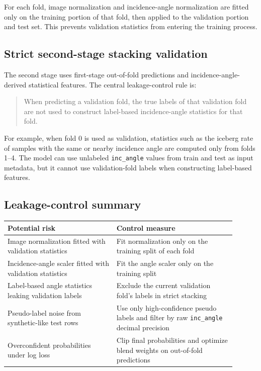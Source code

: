 \documentclass[11pt]{article}
\begin{document}
For each fold, image normalization and incidence-angle normalization are fitted only on the training portion of that fold, then applied to the validation portion and test set. This prevents validation statistics from entering the training process.

\subsection{Strict second-stage stacking validation}

The second stage uses first-stage out-of-fold predictions and incidence-angle-derived statistical features. The central leakage-control rule is:

\begin{quote}
When predicting a validation fold, the true labels of that validation fold are not used to construct label-based incidence-angle statistics for that fold.
\end{quote}

For example, when fold 0 is used as validation, statistics such as the iceberg rate of samples with the same or nearby incidence angle are computed only from folds 1--4. The model can use unlabeled \texttt{inc\_angle} values from train and test as input metadata, but it cannot use validation-fold labels when constructing label-based features.

\subsection{Leakage-control summary}

\begin{center}
\begin{tabular}{p{0.43\linewidth}p{0.47\linewidth}}
\toprule
Potential risk & Control measure \\
\midrule
Image normalization fitted with validation statistics & Fit normalization only on the training split of each fold \\
Incidence-angle scaler fitted with validation statistics & Fit the angle scaler only on the training split \\
Label-based angle statistics leaking validation labels & Exclude the current validation fold's labels in strict stacking \\
Pseudo-label noise from synthetic-like test rows & Use only high-confidence pseudo labels and filter by raw \texttt{inc\_angle} decimal precision \\
Overconfident probabilities under log loss & Clip final probabilities and optimize blend weights on out-of-fold predictions \\
\bottomrule
\end{tabular}
\end{center}
\end{document}
